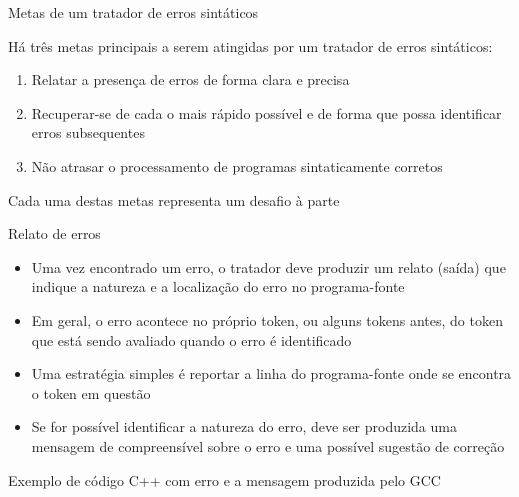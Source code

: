 \begin{frame}[fragile]{Metas de um tratador de erros sintáticos}

    Há três metas principais a serem atingidas por um tratador de erros sintáticos:
    \pause

    \vspace{0.1in}

    \begin{enumerate}
        \item Relatar a presença de erros de forma clara e precisa
        \pause

        \item Recuperar-se de cada o mais rápido possível e de forma que possa identificar erros subsequentes
        \pause

        \item Não atrasar o processamento de programas sintaticamente corretos
    \end{enumerate}

    \vspace{0.1in}
    Cada uma destas metas representa um desafio à parte
\end{frame}

\begin{frame}[fragile]{Relato de erros}

    \begin{itemize}
        \item Uma vez encontrado um erro, o tratador deve produzir um relato (saída) que indique a natureza e a localização do erro no programa-fonte
        \pause

        \item Em geral, o erro acontece no próprio token, ou alguns tokens antes, do token que está sendo avaliado quando o erro é identificado
        \pause

        \item Uma estratégia simples é reportar a linha do programa-fonte onde se encontra o token em questão
        \pause

        \item Se for possível identificar a natureza do erro, deve ser produzida uma mensagem de compreensível sobre o erro e uma possível sugestão de
            correção
    \end{itemize}

\end{frame}

\begin{frame}[fragile]{Exemplo de código C++ com erro e a mensagem produzida pelo GCC}
    \vspace{0.2in}
\end{frame}

